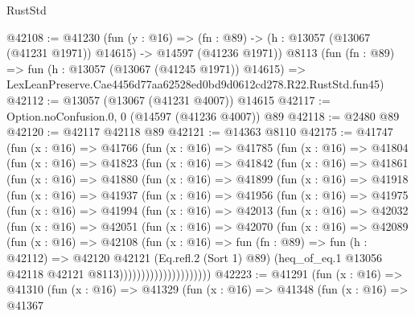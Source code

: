 \begin{lexlean}{RustStd}
\begin{coremodule}
@42108 := @41230
    (fun (y : @16) =>
    (fn : @89) -> (h : @13057 (@13067 (@41231 @1971)) @14615) -> @14597 (@41236 @1971))
    @8113
    (fun (fn : @89) =>
    fun (h : @13057 (@13067 (@41245 @1971)) @14615) =>
    LexLeanPreserve.Cae4456d77aa62528ed0bd9d0612cd278.R22.RustStd.fun45)
@42112 := @13057 (@13067 (@41231 @4007)) @14615
@42117 := Option.noConfusion.{0, 0} (@14597 (@41236 @4007)) @89
@42118 := @2480 @89
@42120 := @42117 @42118 @89
@42121 := @14363 @8110
@42175 := @41747
    (fun (x : @16) =>
    @41766
      (fun (x : @16) =>
      @41785
        (fun (x : @16) =>
        @41804
          (fun (x : @16) =>
          @41823
            (fun (x : @16) =>
            @41842
              (fun (x : @16) =>
              @41861
                (fun (x : @16) =>
                @41880
                  (fun (x : @16) =>
                  @41899
                    (fun (x : @16) =>
                    @41918
                      (fun (x : @16) =>
                      @41937
                        (fun (x : @16) =>
                        @41956
                          (fun (x : @16) =>
                          @41975
                            (fun (x : @16) =>
                            @41994
                              (fun (x : @16) =>
                              @42013
                                (fun (x : @16) =>
                                @42032
                                  (fun (x : @16) =>
                                  @42051
                                    (fun (x : @16) =>
                                    @42070
                                      (fun (x : @16) =>
                                      @42089
                                        (fun (x : @16) =>
                                        @42108
                                          (fun (x : @16) =>
                                          fun (fn : @89) =>
                                          fun (h : @42112) =>
                                          @42120
                                            @42121
                                            (Eq.refl.{2} (Sort 1) @89)
                                            (heq_of_eq.{1}
                                              @13056
                                              @42118
                                              @42121
                                              @8113)))))))))))))))))))))
@42223 := @41291
    (fun (x : @16) =>
    @41310
      (fun (x : @16) =>
      @41329
        (fun (x : @16) =>
        @41348
          (fun (x : @16) =>
          @41367

\end{coremodule}
\end{lexlean}
